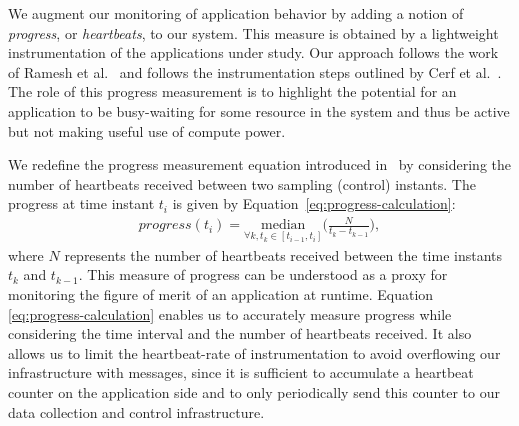 We augment our monitoring of application behavior by adding a notion of \textit{progress}, or \textit{heartbeats}, to our system. This measure is obtained by a lightweight instrumentation of the applications under study.  Our approach follows the work of Ramesh et al.~\cite{ramesh2019understanding} and follows the instrumentation steps outlined by Cerf et al.~\cite{cerf2021sustaining}.
The role of this progress measurement is to highlight the potential for an application to be busy-waiting for some resource in the system and thus be active but not making useful use of compute power.

We redefine the progress measurement equation introduced in~\cite{ramesh2019understanding} by considering the number of heartbeats received between two sampling (control) instants. The progress at time instant $t_i$ is given by Equation~\eqref{eq:progress-calculation}:
\begin{equation}
\begin{aligned}
progress(t_i) = \underset{\forall k,t_k \in [t_{i-1},t_i]}{\text{median}}\bigg(\frac{N}{t_k-t_{k-1}} \bigg),
\end{aligned}
\label{ch4:bg:eq:progress-calculation}
\end{equation}
where $N$ represents the number of heartbeats received between the time instants
$t_k$ and $t_{k-1}$. This measure of
progress can be understood as a proxy for monitoring the figure of merit
of an application at runtime. Equation \eqref{eq:progress-calculation} enables us to accurately measure progress while considering the time interval and the number of heartbeats received. It also allows us to limit the heartbeat-rate of instrumentation to avoid overflowing our infrastructure with messages, since  it is sufficient to accumulate a 
heartbeat counter on the application side and to only periodically send this
counter to our data collection and control infrastructure. 

